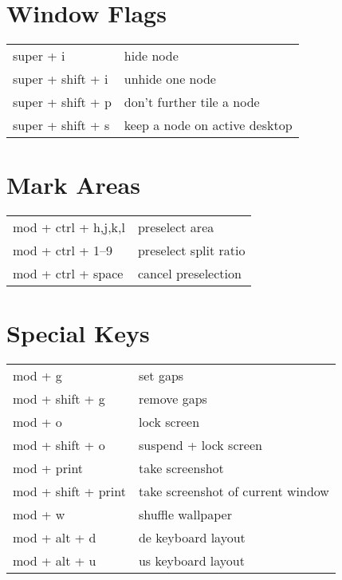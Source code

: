 \documentclass[
    10pt,
    a4paper,
    notitlepage,
]{scrartcl}
\begin{document}
\section{Window Flags}
\begin{tabular}{p{4cm}l}
    super + i           & hide node                         \\
    super + shift + i   & unhide one node                   \\
    super + shift + p   & don't further tile a node         \\
    super + shift + s   & keep a node on active desktop
\end{tabular}

\section{Mark Areas}
\begin{tabular}{p{4cm}l}
    mod + ctrl + h,j,k,l  & preselect area                    \\
    mod + ctrl + 1--9     & preselect split ratio             \\
    mod + ctrl + space    & cancel preselection
\end{tabular}

\section{Special Keys}
\begin{tabular}{p{4cm}l}
    mod + g             & set gaps                              \\
    mod + shift + g     & remove gaps                           \\
    mod + o             & lock screen                           \\
    mod + shift + o     & suspend + lock screen                 \\
    mod + print         & take screenshot                       \\
    mod + shift + print & take screenshot of current window     \\
    mod + w             & shuffle wallpaper                     \\
    mod + alt + d       & de keyboard layout                    \\
    mod + alt + u       & us keyboard layout
\end{tabular}
\end{document}
